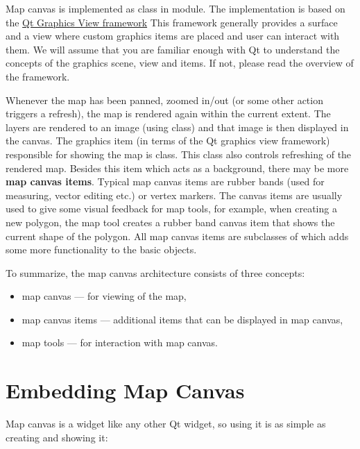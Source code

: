 \documentclass[letterpaper,10pt,english]{manual}
\begin{document}
Map canvas is implemented as  class in 
module.  The implementation is based on the \href{http://doc.qt.nokia.com/graphicsview.html}{Qt Graphics View framework} This framework generally provides
a surface and a view where custom graphics items are placed and user can
interact with them.  We will assume that you are familiar enough with Qt to
understand the concepts of the graphics scene, view and items.  If not,
please read the overview of the framework.

Whenever the map has been panned, zoomed in/out (or some other action
triggers a refresh), the map is rendered again within the current extent.
The layers are rendered to an image (using  class) and
that image is then displayed in the canvas.  The graphics item (in terms of the
Qt graphics view framework) responsible for showing the map is
 class.  This class also controls refreshing of the
rendered map. Besides this item which acts as a background, there may be more
\textbf{map canvas items}.  Typical map canvas items are rubber bands (used for
measuring, vector editing etc.) or vertex markers. The canvas items are usually
used to give some visual feedback for map tools, for example, when creating a
new polygon, the map tool creates a rubber band canvas item that shows the
current shape of the polygon. All map canvas items are subclasses of
 which adds some more functionality to the basic
 objects.

To summarize, the map canvas architecture consists of three concepts:
\begin{itemize}
\item {} 
map canvas --- for viewing of the map,

\item {} 
map canvas items --- additional items that can be displayed in map canvas,

\item {} 
map tools --- for interaction with map canvas.

\end{itemize}


\section{Embedding Map Canvas}

Map canvas is a widget like any other Qt widget, so using it is as simple as
creating and showing it:
\end{document}
